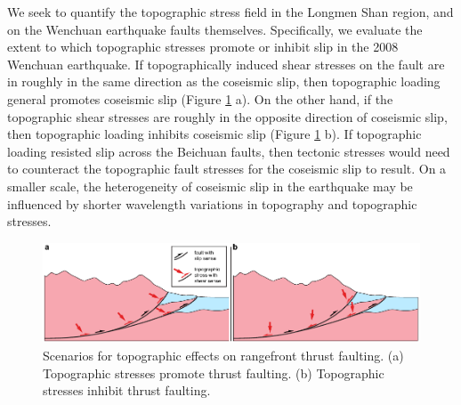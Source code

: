 \documentclass[twocolumn,jgrga]{AGUTeX}
\begin{document}
\begin{article}
We seek to quantify the topographic stress field in the Longmen Shan
region, and on the Wenchuan earthquake faults themselves. Specifically,
we evaluate the extent to which topographic stresses promote or inhibit
slip in the 2008 Wenchuan earthquake. If topographically induced shear
stresses on the fault are in roughly in the same direction as the
coseismic slip, then topographic loading general promotes coseismic slip
(Figure \ref{fig:topo_fault_scenarios} a). On the other hand, if the
topographic shear stresses are roughly in the opposite direction of
coseismic slip, then topographic loading inhibits coseismic slip (Figure
\ref{fig:topo_fault_scenarios} b). If topographic loading resisted slip
across the Beichuan faults, then tectonic stresses would need to
counteract the topographic fault stresses for the coseismic slip to
result. On a smaller scale, the heterogeneity of coseismic slip in the
earthquake may be influenced by shorter wavelength variations in
topography and topographic stresses.

\begin{figure}[t!]
\centering
\includegraphics[width=40pc]{../figures/topo_stress_possibilities.pdf}
\caption{Scenarios for topographic effects on rangefront thrust
faulting. (a) Topographic stresses promote thrust faulting. (b)
Topographic stresses inhibit thrust faulting.}
\label{fig:topo_fault_scenarios}
\end{figure}


\end{article}
\end{document}
